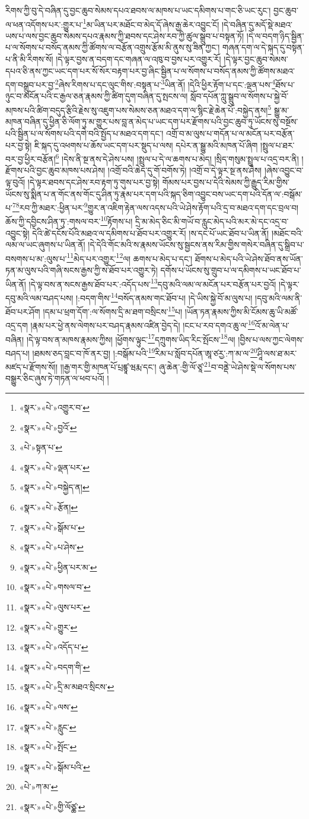 རིགས་ཀྱི་བུ་དེ་བཞིན་དུ་བྱང་ཆུབ་སེམས་དཔའ་ཐབས་ལ་མཁས་པ་ཡང་དམིགས་པ་གང་ཅི་ཡང་རུང་། བྱང་ཆུབ་ལ་ཕན་འདོགས་པར་:གྱུར་པ་\footnote{«སྣར་»«པེ་»འགྱུར་བ་}མ་ཡིན་པར་མཐོང་བ་མེད་དོ་ཞེས་རྒྱ་ཆེར་འབྱུང་ངོ། །དེ་བཞིན་དུ་མདོ་སྡེ་མཐའ་ཡས་པ་ལས་བྱང་ཆུབ་སེམས་དཔའ་རྣམས་ཀྱི་ཐབས་དང་ཤེས་རབ་ཀྱི་ཚུལ་སྒྲུབ་པ་བསྟན་ཏོ། །དེ་ལ་བདག་ཉིད་སྦྱིན་པ་ལ་སོགས་པ་བསོད་ནམས་ཀྱི་ཚོགས་ལ་བརྩོན་འགྲུས་རྩོམ་མི་ནུས་སུ་ཟིན་ཀྱང་། གཞན་དག་ལ་དེ་སྐད་དུ་བསྟན་པ་ནི་མི་རིགས་སོ། །དེ་ལྟར་བྱས་ན་བདག་དང་གཞན་ལ་འཁུ་བ་བྱས་པར་འགྱུར་རོ། །དེ་ལྟར་བྱང་ཆུབ་སེམས་དཔའ་ཅི་ནས་ཀྱང་ཡང་དག་པར་སོ་སོར་བརྟག་པར་བྱ་ཞིང་སྦྱིན་པ་ལ་སོགས་པ་བསོད་ནམས་ཀྱི་ཚོགས་མཐའ་དག་བསྒྲུབ་པར་བྱ་\footnote{«སྣར་»«པེ་»བྱའོ་}ཞེས་རིགས་པ་དང་ལུང་གིས་:བསྟན་པ་\footnote{«པེ་»སྟན་པ་}ཡིན་ནོ། །དེའི་ཕྱིར་རྟོག་པ་དང་:ལྡན་པས་\footnote{«སྣར་»«པེ་»ལྡན་པར་}ཐོས་པ་ཉུང་བ་མངོན་པའི་ང་རྒྱལ་ཅན་རྣམས་ཀྱི་ཚིག་དུག་བཞིན་དུ་སྤངས་ལ། སློབ་དཔོན་ཀླུ་སྒྲུབ་ལ་སོགས་པ་སྐྱེ་བོ་མཁས་པའི་ཚིག་བདུད་རྩིའི་རྗེས་སུ་འཇུག་པས་སེམས་ཅན་མཐའ་དག་ལ་སྙིང་རྗེ་ཆེན་པོ་:བསྐྱེད་ནས།\footnote{«སྣར་»«པེ་»བསྐྱེད་ན།} སྒྱུ་མ་མཁན་བཞིན་དུ་ཕྱིན་ཅི་ལོག་ཏུ་མ་གྱུར་པས་བླ་ན་མེད་པ་ཡང་དག་པར་རྫོགས་པའི་བྱང་ཆུབ་ཏུ་ཡོངས་སུ་བསྔོས་པའི་སྦྱིན་པ་ལ་སོགས་པའི་དགེ་བའི་སྤྱོད་པ་མཐའ་དག་དང་། འགྲོ་བ་མ་ལུས་པ་གདོན་པ་ལ་མངོན་པར་བརྩོན་པར་བྱ་སྟེ། ཇི་སྐད་དུ་འཕགས་པ་ཆོས་ཡང་དག་པར་སྡུད་པ་ལས། དཔེར་ན་སྒྱུ་མའི་མཁན་པོ་ཞིག །སྤྲུལ་པ་ཐར་བར་བྱ་ཕྱིར་བརྩོན།\footnote{«སྣར་»«པེ་»རྩོན།} །དེས་ནི་སྔ་ནས་དེ་ཤེས་པས། །སྤྲུལ་པ་དེ་ལ་ཆགས་པ་མེད། །སྲིད་གསུམ་སྤྲུལ་པ་འདྲ་བར་ནི། །རྫོགས་པའི་བྱང་ཆུབ་མཁས་པས་ཤེས། །འགྲོ་བའི་ཆེད་དུ་གོ་བགོས་ཏེ། །འགྲོ་བ་དེ་ལྟར་སྔ་ནས་ཤེས། །ཞེས་འབྱུང་བ་ལྟ་བུའོ། །དེ་ལྟར་ཐབས་དང་ཤེས་རབ་རྟག་ཏུ་གུས་པར་བྱ་སྟེ། གོམས་པར་བྱས་པ་དེའི་སེམས་ཀྱི་རྒྱུད་རིམ་གྱིས་ཡོངས་སུ་སྨིན་པ་ན་གོང་ནས་གོང་དུ་ཤིན་ཏུ་རྣམ་པར་དག་པའི་སྐད་ཅིག་འབྱུང་བས་ཡང་དག་པའི་དོན་ལ་:བསྒོམ་པ་\footnote{«སྣར་»«པེ་»སྒོམ་པ་}\footnote{«སྣར་»«པེ་»པ་ཤེས་}རབ་ཀྱི་མཐར་:ཕྱིན་པར་\footnote{«སྣར་»«པེ་»ཕྱིན་པར་མ་}གྱུར་ན་འཇིག་རྟེན་ལས་འདས་པའི་ཡེ་ཤེས་རྟོག་པའི་དྲ་བ་མཐའ་དག་དང་བྲལ་བ། ཆོས་ཀྱི་དབྱིངས་ཤིན་ཏུ་:གསལ་བར་\footnote{«སྣར་»«པེ་»གསལ་བ་}རྟོགས་པ། དྲི་མ་མེད་ཅིང་མི་གཡོ་བ་རླུང་མེད་པའི་མར་མེ་དང་འདྲ་བ་འབྱུང་སྟེ། དེའི་ཚེ་དངོས་པོའི་མཐའ་ལ་དམིགས་པ་ཐོབ་པར་འགྱུར་རོ། །ས་དང་པོ་ཡང་ཐོབ་པ་ཡིན་ནོ། །མཐོང་བའི་ལམ་ལ་ཡང་ཞུགས་པ་ཡིན་ནོ། །དེ་དེའི་གོང་མའི་ས་རྣམས་ཡོངས་སུ་སྦྱངས་ནས་རིམ་གྱིས་གསེར་བཞིན་དུ་སྒྲིབ་པ་བསགས་པ་མ་:ལུས་པ་\footnote{«སྣར་»«པེ་»ལུས་པར་}མེད་པར་འགྱུར་\footnote{«སྣར་»«པེ་»གྱུར་}ལ། ཆགས་པ་མེད་པ་དང་། ཐོགས་པ་མེད་པའི་ཡེ་ཤེས་ཐོབ་ནས་ཡོན་ཏན་མ་ལུས་པའི་གཞི་སངས་རྒྱས་ཀྱི་ས་ཐོབ་པར་འགྱུར་ཏེ། དགོས་པ་ཡོངས་སུ་གྲུབ་པ་ལ་དམིགས་པ་ཡང་ཐོབ་པ་ཡིན་ནོ། །དེ་ལྟ་བས་ན་སངས་རྒྱས་ཐོབ་པར་:འདོད་པས་\footnote{«སྣར་»«པེ་»འདོད་པ་}དབུ་མའི་ལམ་ལ་མངོན་པར་བརྩོན་པར་བྱའོ། །དེ་ལྟར་དབུ་མའི་ལམ་བཤད་པས། །:བདག་གིས་\footnote{«སྣར་»«པེ་»བདག་གི་}བསོད་ནམས་གང་ཐོབ་པ། །དེ་ཡིས་སྐྱེ་བོ་མ་ལུས་པ། །དབུ་མའི་ལམ་ནི་ཐོབ་པར་ཤོག །དམ་པ་ཕྲག་དོག་:ལ་སོགས་དྲི་མ་ཐག་བསྲིངས་\footnote{«སྣར་»«པེ་»དྲི་མ་མཐའ་སྲིངས་}པ། །ཡོན་ཏན་རྣམས་ཀྱིས་མི་ངོམས་ཆུ་ཡི་མཚོ་འདྲ་དག །རྣམ་པར་ཕྱེ་ནས་ལེགས་པར་བཤད་རྣམས་འཛིན་བྱེད་དེ། །ངང་པ་རབ་དགའ་ཆུ་ལ་\footnote{«སྣར་»«པེ་»ལས་}འོ་མ་ལེན་པ་བཞིན། །དེ་ལྟ་བས་ན་མཁས་རྣམས་ཀྱིས། །ཕྱོགས་ལྟུང་\footnote{«སྣར་»«པེ་»རླུང་}དཀྲུགས་ཡིད་རིང་སྤོངས་\footnote{«སྣར་»«པེ་»སྤོང་}ལ། །བྱིས་པ་ལས་ཀྱང་ལེགས་བཤད་པ། །ཐམས་ཅད་བླང་བ་ཁོ་ནར་བྱ། །:བསྒོམ་པའི་\footnote{«སྣར་»«པེ་»སྒོམ་པའི་}རིམ་པ་སློབ་དཔོན་ཨཱ་ཙརྱ་:ཀ་མ་ལ་\footnote{«པེ་»ཀ་མ་}ཤཱི་ལས་ཐ་མར་མཛད་པ་རྫོགས་སོ།། །།རྒྱ་གར་གྱི་མཁན་པོ་པྲཛྙཱ་ཝརྨ་དང་། ཞུ་ཆེན་:གྱི་ལོ་ཙཱ་\footnote{«སྣར་»«པེ་»གྱི་ལོཙྪ་}བ་བནྡེ་ཡེ་ཤེས་སྡེ་ལ་སོགས་པས་བསྒྱུར་ཅིང་ཞུས་ཏེ་གཏན་ལ་ཕབ་པའོ། ། 